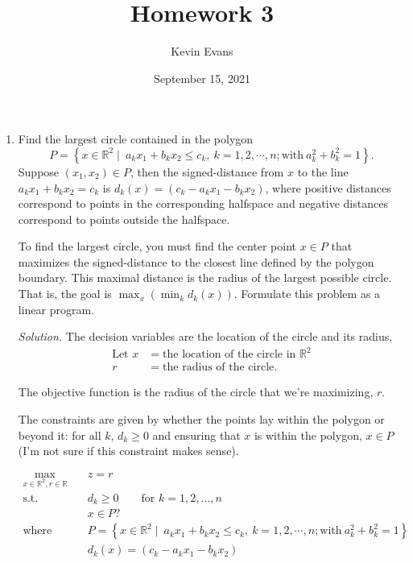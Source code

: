 \documentclass{homework}
\title{Homework 3}
\author{Kevin Evans}
\date{September 15, 2021}
\newcommand{\st}{\mathrm{s.t.}}
\begin{document}
	\maketitle
	\begin{enumerate}
		\item Find the largest circle contained in the polygon
		\[ P=\left\{x\in\mathbb{R}^2\mid\:a_kx_1+b_kx_2\le c_k,\:k=1,2,\cdots,n; \text{with}~a_k^2+b_k^2=1\right\}. \]
		Suppose $(x_1, x_2) \in P$, then the signed-distance from $x$ to the line $a_k x_1 + b_k x_2 = c_k$ is $d_k(x) = \left(c_k - a_k x_1 - b_k x_2\right)$, where positive distances correspond to points in the corresponding halfspace and negative distances correspond to points outside the halfspace. 
		
		To find the largest circle, you must find the center point $x \in P$ that maximizes the signed-distance to the closest line defined by the polygon boundary.  This maximal distance is the radius of the largest possible circle. That is, the goal is $\max_x(\min_k d_k(x))$. Formulate this problem as a linear program.
		
		\textit{Solution.} \quad The decision variables are the location of the circle and its radius, \begin{align*}
			\text{Let } x & = \text{the location of the circle in $\mathbb{R}^2$} \\
				r & = \text{the radius of the circle}.
		\end{align*}
	
		The objective function is the radius of the circle that we're maximizing, $r$.
		
		The constraints are given by whether the points lay within the polygon or beyond it: for all $k$, $d_k \ge 0$ and ensuring that $x$ is within the polygon, $x \in P$ (I'm not sure if this constraint makes sense).
		
		\begin{tcolorbox}
			\vspace{-1em}
			\begin{align*}
				\max_{x \in \mathbb{R}^2, r \in \mathbb{R}} \quad & z=r \\
				\st \quad & d_k \ge 0 \qquad \text{for } k = 1, 2, \dots, n\\
					& x \in P?\\
				\text{where} \quad & P=\left\{x\in\mathbb{R}^2\mid\:a_kx_1+b_kx_2\le c_k,\:k=1,2,\cdots,n; \text{with}~a_k^2+b_k^2=1\right\} \\
				& d_k(x) = \left(c_k - a_k x_1 - b_k x_2\right)
			\end{align*}
		\end{tcolorbox}
		

\end{enumerate}
\end{document}
